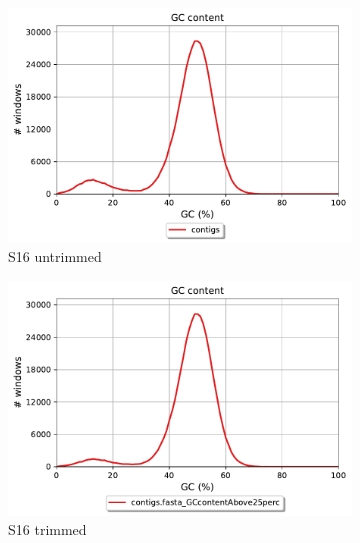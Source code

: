 \begin{figure}[h!]
    \begin{subfigure}[]{0.49\textwidth}
        \centering
        \includegraphics[width=\textwidth]{Figures/S16_GC_content_plot_untrimmed.pdf}
        \caption{S16 untrimmed}
        \label{fig:S16GCuntrimmed}
    \end{subfigure}
    \begin{subfigure}[]{0.49\textwidth}
        \centering
        \includegraphics[width=\textwidth]{Figures/S16_GC_content_plot_Trimmed.pdf}
        \caption{S16 trimmed}
        \label{fig:S16GCtrimmed}
    \end{subfigure}
    \begin{subfigure}[]{0.49\textwidth}
        \centering

\end{subfigure}
\end{figure}
